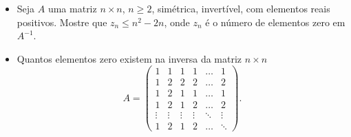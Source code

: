 \begin{itemize}
    \item[(a)] Seja \(A\) uma matriz \(n\times n\), \(n\geq 2\), simétrica, invertível, com elementos reais positivos. Mostre que \(z_n\leq n^2-2n\), onde \(z_n\) é o número de elementos zero em \(A^{-1}\).

    \item[(b)] Quantos elementos zero existem na inversa da matriz \(n\times n\)
    \[ A = \begin{pmatrix}
        1&1&1&1&\ldots&1\\
        1&2&2&2&\ldots&2\\
        1&2&1&1&\ldots&1\\
        1&2&1&2&\ldots&2\\
        \vdots&\vdots&\vdots&\vdots&\ddots&\vdots\\
        1&2&1&2&\ldots&\ddots
    \end{pmatrix}. \]
\end{itemize}
